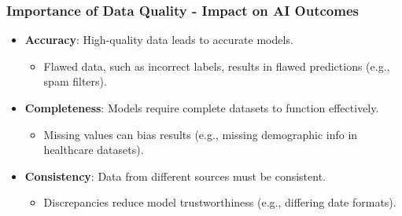 \documentclass[aspectratio=169]{beamer}
\begin{document}
\begin{frame}[fragile]
    \frametitle{Importance of Data Quality - Impact on AI Outcomes}
    
    \begin{itemize}
        \item \textbf{Accuracy}: High-quality data leads to accurate models. 
        \begin{itemize}
            \item Flawed data, such as incorrect labels, results in flawed predictions (e.g., spam filters).
        \end{itemize}
        
        \item \textbf{Completeness}: Models require complete datasets to function effectively.
        \begin{itemize}
            \item Missing values can bias results (e.g., missing demographic info in healthcare datasets). 
        \end{itemize}
        
        \item \textbf{Consistency}: Data from different sources must be consistent.
        \begin{itemize}
            \item Discrepancies reduce model trustworthiness (e.g., differing date formats).
        \end{itemize}
    \end{itemize}
\end{frame}
\end{document}
